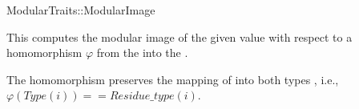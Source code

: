 \begin{ccRefFunctionObjectConcept}{ModularTraits::ModularImage}

\ccDefinition

This  computes the modular image of the given value 
with respect to a homomorphism $\varphi$ from the 
 into the .

The homomorphism preserves the mapping of  into both types
, i.e., $\varphi(Type(i)) == Residue\_type(i)$.


\ccTypes
{}


 
\ccRefines 
{} 

\ccSeeAlso
{}

\end{ccRefFunctionObjectConcept}